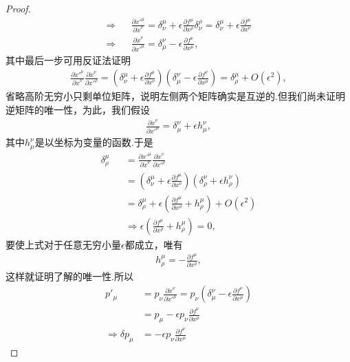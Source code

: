 \documentclass[10pt]{article}
\begin{document}
\begin{proof}
\begin{eqnarray*}
		\Rightarrow&&\frac{\partial \dot{x}'^\mu}{\partial \dot{x}^\nu}=\delta^\mu_\nu+\epsilon \frac{\partial f^\mu}{\partial x^\rho}\delta^\rho_\nu=\delta^\mu_\nu+\epsilon \frac{\partial f^\mu}{\partial x^\nu}\\
		\Rightarrow&&\frac{\partial \dot{x}^\nu}{\partial \dot{x}'^\mu}=\delta^\nu_\mu-\epsilon \frac{\partial f^\nu}{\partial x^\mu},
	\end{eqnarray*}
	其中最后一步可用反证法证明
	\begin{eqnarray*}
		\frac{\partial \dot{x}'^\mu}{\partial \dot{x}^\nu}\frac{\partial \dot{x}^\nu}{\partial \dot{x}'^\rho}=\left(\delta^\mu_\nu+\epsilon \frac{\partial f^\mu}{\partial x^\nu}\right)\left(\delta^\nu_\mu-\epsilon \frac{\partial f^\nu}{\partial x^\mu}\right)=\delta^\mu_\rho+O(\epsilon^2),
	\end{eqnarray*}
	省略高阶无穷小只剩单位矩阵，说明左侧两个矩阵确实是互逆的.但我们尚未证明逆矩阵的唯一性，为此，我们假设
	\begin{eqnarray*}
		\frac{\partial \dot{x}^\nu}{\partial \dot{x}'^\mu}=\delta^\nu_\mu+\epsilon h^\nu_\mu,
	\end{eqnarray*}
	其中$h^\nu_\mu$是以坐标为变量的函数.于是
	\begin{eqnarray*}
		\delta^\mu_\rho&&=\frac{\partial \dot{x}'^\mu}{\partial \dot{x}^\nu}\frac{\partial \dot{x}^\nu}{\partial \dot{x}'^\rho}\\
		&&=\left(\delta^\mu_\nu+\epsilon \frac{\partial f^\mu}{\partial x^\nu}\right)\left(\delta^\nu_\rho+\epsilon h^\nu_\rho\right)\\
		&&=\delta^\mu_\rho+\epsilon\left(\frac{\partial f^\mu}{\partial x^\rho}+h^\mu_\rho\right)+O(\epsilon^2)\\
		&&\Rightarrow\epsilon\left(\frac{\partial f^\mu}{\partial x^\rho}+h^\mu_\rho\right)=0,
	\end{eqnarray*}
	要使上式对于任意无穷小量$\epsilon$都成立，唯有	
	\begin{eqnarray*}
		h^\mu_\rho=-\frac{\partial f^\mu}{\partial x^\rho},
	\end{eqnarray*}
	这样就证明了解的唯一性.所以
	\begin{equation}\label{pr:delta p}
	\begin{split}
		p'_\mu&=p_\nu\frac{\partial \dot{x}^\nu}{\partial \dot{x}'^\mu}=p_\nu\left(\delta^\nu_\mu-\epsilon \frac{\partial f^\nu}{\partial x^\mu}\right)\\
		&=p_\mu-\epsilon p_\nu\frac{\partial f^\nu}{\partial x^\mu}\\
		\Rightarrow\delta p_\mu&=-\epsilon p_\nu\frac{\partial f^\nu}{\partial x^\mu}

\end{split}
\end{equation}
\end{proof}
\end{document}
